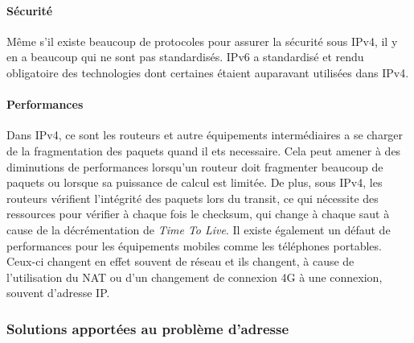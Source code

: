 \paragraph{Sécurité}
Même s'il existe beaucoup de protocoles pour assurer la sécurité sous IPv4, il
y en a beaucoup qui ne sont pas standardisés. IPv6 a standardisé et rendu
obligatoire des technologies dont certaines étaient auparavant utilisées dans
IPv4. 

\paragraph{Performances}
Dans IPv4, ce sont les routeurs et autre équipements
intermédiaires a se charger de la fragmentation des paquets quand il ets
necessaire. Cela peut amener à des diminutions de performances lorsqu'un
routeur doit fragmenter beaucoup de paquets ou lorsque sa puissance de calcul
est limitée. De plus, sous IPv4, les routeurs vérifient l'intégrité des paquets lors du
transit, ce qui nécessite des ressources pour vérifier à chaque fois le
checksum, qui change à chaque saut à cause de la décrémentation de {\it Time To
Live}.
\smallbreak
Il existe également un défaut de performances pour les équipements mobiles
comme les téléphones portables. Ceux-ci changent en effet souvent de réseau et
ils changent, à cause de l'utilisation du NAT ou d'un changement de connexion
4G à une connexion, souvent d'adresse IP. 


\subsubsection{Solutions apportées au problème d'adresse}

